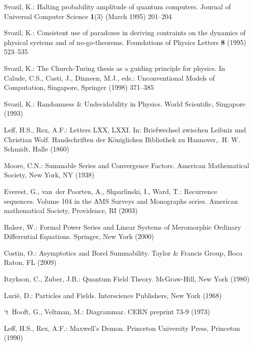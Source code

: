 \documentclass{llncs}
\begin{document}
\begin{thebibliography}{10}
Svozil, K.:
\newblock Halting probability amplitude of quantum computers.
\newblock Journal of Universal Computer Science \textbf{1}(3) (March 1995)
  201--204

Svozil, K.:
\newblock Consistent use of paradoxes in deriving contraints on the dynamics of
  physical systems and of no-go-theorems.
\newblock Foundations of Physics Letters \textbf{8} (1995)  523--535

Svozil, K.:
\newblock The {C}hurch-{T}uring thesis as a guiding principle for physics.
\newblock In Calude, C.S., Casti, J., Dinneen, M.J., eds.: Unconventional
  Models of Computation, Singapore, Springer (1998)  371--385

Svozil, K.:
\newblock Randomness \& Undecidability in Physics.
\newblock World Scientific, Singapore (1993)

Leff, H.S., Rex, A.F.:
\newblock Letters {LXX}, {LXXI}.
\newblock In: {B}riefwechsel zwischen {L}eibniz und {C}hristian {W}olf.
  {H}andschriften der {K}{\"{o}}niglichen Bibliothek zu {H}annover,.
\newblock H. W. Schmidt, Halle (1860)

Moore, C.N.:
\newblock Summable Series and Convergence Factors.
\newblock American Mathematical Society, New York, NY (1938)

Everest, G., van~der Poorten, A., Shparlinski, I., Ward, T.:
\newblock Recurrence sequences. {V}olume 104 in the {AMS} Surveys and
  Monographs series.
\newblock American mathematical Society, Providence, RI (2003)

Balser, W.:
\newblock Formal Power Series and Linear Systems of Meromorphic Ordinary
  Differential Equations.
\newblock Springer, New York (2000)

Costin, O.:
\newblock Asymptotics and {B}orel Summability.
\newblock Taylor \& Francis Group, Boca Raton, FL (2009)

Itzykson, C., Zuber, J.B.:
\newblock Quantum Field Theory.
\newblock McGraw-Hill, New York (1980)

Luri{\`{e}}, D.:
\newblock Particles and Fields.
\newblock Interscience Publishers, New York (1968)

`t~Hooft, G., Veltman, M.:
\newblock Diagrammar.
\newblock CERN preprint 73-9 (1973)

Leff, H.S., Rex, A.F.:
\newblock Maxwell's Demon.
\newblock Princeton University Press, Princeton (1990)


\end{thebibliography}
\end{document}
